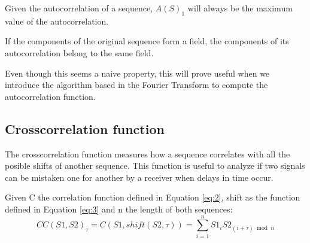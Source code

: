 \begin{corollary}\label{autocorrelation:coro:1}
  Given the autocorrelation of a sequence, $A(S)_{1}$ will always be the
  maximum value of the autocorrelation.
\end{corollary}

\begin{property}

  If the components of the original sequence form a field, the components of
  its autocorrelation belong to the same field.

\end{property}

Even though this seems a naive property, this will prove
useful when we introduce the algorithm based in the Fourier Transform to
compute the autocorrelation function.









\subsection{Crosscorrelation function}

The crosscorrelation function measures how a sequence correlates with all
the posible shifts of another sequence. This function is useful to analyze if two
signals can be mistaken one for another by a receiver when delays in time occur.


\begin{definition}[Crosscorrelation]\label{def:4}
  Given C the correlation function defined in Equation \eqref{eq:2}, shift as the function defined in Equation \eqref{eq:3} and n the length of both sequences:
  \begin{equation}\label{eq:7}
    CC(S1, S2)_{\tau} = C(S1, shift(S2, \tau)) = \sum_{i=1}^{n}S1_{i}S2_{(i+\tau) \bmod n}
  \end{equation}
\end{definition}

